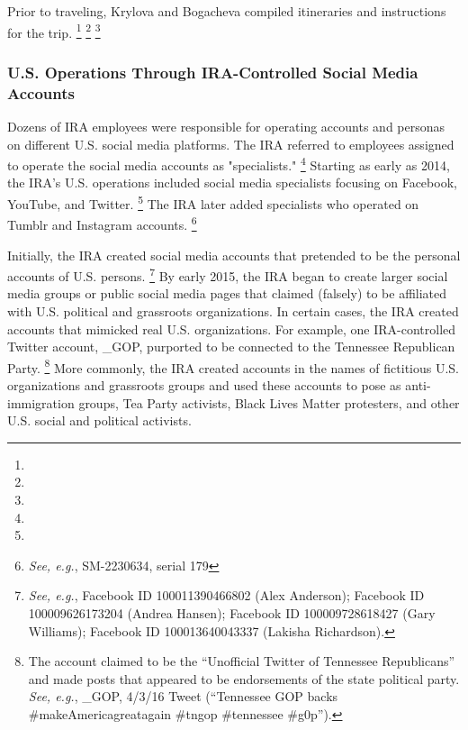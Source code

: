 Prior to traveling, Krylova and Bogacheva compiled itineraries and instructions for the trip.
\footnote{}
\footnote{}
\footnote{}

\subsubsection{U.S. Operations Through IRA-Controlled Social Media Accounts}

Dozens of IRA employees were responsible for operating accounts and personas on different U.S. social media platforms.
The IRA referred to employees assigned to operate the social media accounts as "specialists."%
\footnote{}
Starting as early as 2014, the IRA's U.S. operations included social media specialists focusing on Facebook, YouTube, and Twitter.%
\footnote{}
The IRA later added specialists who operated on Tumblr and Instagram accounts.%
\footnote{\textit{See, e.g.}, SM-2230634, serial 179}

Initially, the IRA created social media accounts that pretended to be the personal accounts of U.S. persons.%
\footnote{\textit{See, e.g.}, Facebook ID 100011390466802 (Alex Anderson);
Facebook ID 100009626173204 (Andrea Hansen);
Facebook ID 100009728618427 (Gary Williams);
Facebook ID 100013640043337 (Lakisha Richardson).}
By early 2015, the IRA began to create larger social media groups or public social media pages that claimed (falsely) to be affiliated with U.S. political and grassroots organizations.
In certain cases, the IRA created accounts that mimicked real U.S. organizations.
For example, one IRA-controlled Twitter account, \@TEN\_GOP, purported to be connected to the Tennessee Republican Party.%
\footnote{The account claimed to be the “Unofficial Twitter of Tennessee Republicans” and made posts that appeared to be endorsements of the state political party.
\textit{See, e.g.}, \@TEN\_GOP, 4/3/16 Tweet (“Tennessee GOP backs \@realDonaldTrumpperiod \#makeAmericagreatagain \#tngop \#tennessee \#g0p”).}
More commonly, the IRA created accounts in the names of fictitious U.S. organizations and grassroots groups and used these accounts to pose as anti-immigration groups, Tea Party activists, Black Lives Matter protesters, and other U.S. social and political activists.


